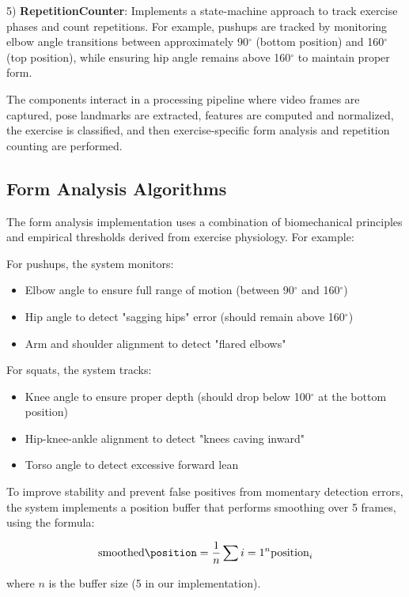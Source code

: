 \documentclass[11pt]{article}
\begin{document}
5) \textbf{RepetitionCounter}: Implements a state-machine approach to track exercise phases and count repetitions. For example, pushups are tracked by monitoring elbow angle transitions between approximately 90$^\circ$ (bottom position) and 160$^\circ$ (top position), while ensuring hip angle remains above 160$^\circ$ to maintain proper form.

The components interact in a processing pipeline where video frames are captured, pose landmarks are extracted, features are computed and normalized, the exercise is classified, and then exercise-specific form analysis and repetition counting are performed.

\subsection{Form Analysis Algorithms}
The form analysis implementation uses a combination of biomechanical principles and empirical thresholds derived from exercise physiology. For example:

For pushups, the system monitors:
\begin{itemize}
\item Elbow angle to ensure full range of motion (between 90$^\circ$ and 160$^\circ$)
\item Hip angle to detect "sagging hips" error (should remain above 160$^\circ$)
\item Arm and shoulder alignment to detect "flared elbows"
\end{itemize}

For squats, the system tracks:
\begin{itemize}
\item Knee angle to ensure proper depth (should drop below 100$^\circ$ at the bottom position)
\item Hip-knee-ankle alignment to detect "knees caving inward"
\item Torso angle to detect excessive forward lean
\end{itemize}

To improve stability and prevent false positives from momentary detection errors, the system implements a position buffer that performs smoothing over 5 frames, using the formula:

\begin{equation}
\text{smoothed\position} = \frac{1}{n} \sum{i=1}^{n} \text{position}_i
\end{equation}

where $n$ is the buffer size (5 in our implementation).
\end{document}
